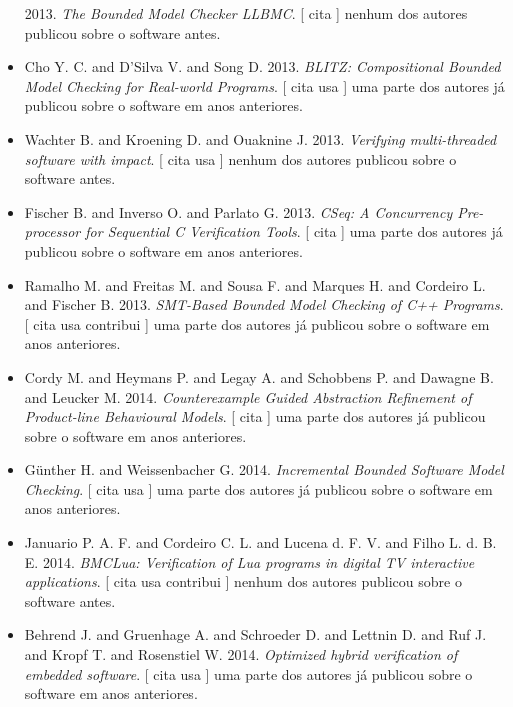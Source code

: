 \begin{itemize}
      2013.
        \textit{ The Bounded Model Checker LLBMC}.
      [
          cita
      ]
nenhum dos autores publicou sobre o software antes.
\item Cho Y. C. and D'Silva V. and Song D.
      2013.
        \textit{ BLITZ: Compositional Bounded Model Checking for Real-world Programs}.
      [
          cita
          usa
      ]
uma parte dos autores já publicou sobre o software em anos anteriores.
\item Wachter B. and Kroening D. and Ouaknine J.
      2013.
        \textit{ Verifying multi-threaded software with impact}.
      [
          cita
          usa
      ]
nenhum dos autores publicou sobre o software antes.
\item Fischer B. and Inverso O. and Parlato G.
      2013.
        \textit{ CSeq: A Concurrency Pre-processor for Sequential C Verification Tools}.
      [
          cita
      ]
uma parte dos autores já publicou sobre o software em anos anteriores.
\item Ramalho M. and Freitas M. and Sousa F. and Marques H. and Cordeiro L. and Fischer B.
      2013.
        \textit{ SMT-Based Bounded Model Checking of C++ Programs}.
      [
          cita
          usa
          contribui
      ]
uma parte dos autores já publicou sobre o software em anos anteriores.
\item Cordy M. and Heymans P. and Legay A. and Schobbens P. and Dawagne B. and Leucker M.
      2014.
        \textit{ Counterexample Guided Abstraction Refinement of Product-line Behavioural Models}.
      [
          cita
      ]
uma parte dos autores já publicou sobre o software em anos anteriores.
\item G\"{u}nther H. and Weissenbacher G.
      2014.
        \textit{ Incremental Bounded Software Model Checking}.
      [
          cita
          usa
      ]
uma parte dos autores já publicou sobre o software em anos anteriores.
\item Januario P. A. F. and Cordeiro C. L. and Lucena d. F. V. and Filho L. d. B. E.
      2014.
        \textit{ BMCLua: Verification of Lua programs in digital TV interactive applications}.
      [
          cita
          usa
          contribui
      ]
nenhum dos autores publicou sobre o software antes.
\item Behrend J. and Gruenhage A. and Schroeder D. and Lettnin D. and Ruf J. and Kropf T. and Rosenstiel W.
      2014.
        \textit{ Optimized hybrid verification of embedded software}.
      [
          cita
          usa
      ]
uma parte dos autores já publicou sobre o software em anos anteriores.

\end{itemize}
